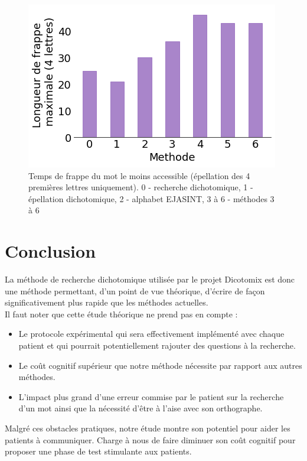 \documentclass[twoside,twocolumn]{article}
\begin{document}
\begin{center}
\begin{figure}
  \includegraphics[scale=0.5]{frappe-maxi4.png}
  \caption{Temps de frappe du mot le moins accessible (épellation des 4 premières lettres uniquement). 0 - recherche dichotomique, 1 - épellation dichotomique, 2 - alphabet EJASINT, 3 à 6 - méthodes 3 à 6}
  \label{maxi4}
\end{figure}
\end{center}


\section{Conclusion}

La méthode de recherche dichotomique utilisée par le projet Dicotomix est donc une méthode permettant, d'un point de vue théorique, d'écrire de façon significativement plus rapide que les méthodes actuelles. \\
Il faut noter que cette étude théorique ne prend pas en compte :
\begin{itemize}
\item Le protocole expérimental qui sera effectivement implémenté avec chaque patient et qui pourrait potentiellement rajouter des questions à la recherche.
\item Le coût cognitif supérieur que notre méthode nécessite par rapport aux autres méthodes.
\item L'impact plus grand d'une erreur commise par le patient sur la recherche d'un mot ainsi que la nécessité d'être à l'aise avec son orthographe.
\end{itemize} 

Malgré ces obstacles pratiques, notre étude montre son potentiel pour aider les patients à communiquer. Charge à nous de faire diminuer son coût cognitif pour proposer une phase de test stimulante aux patients.
\end{document}
